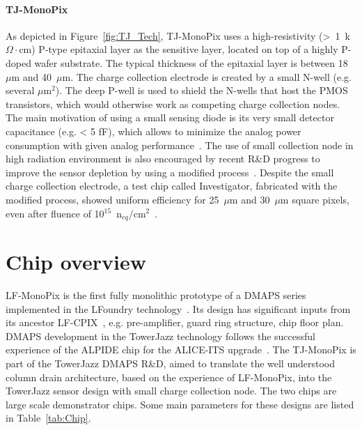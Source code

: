 \documentclass[a4paper,11pt]{article}
\begin{document}
\paragraph{TJ-MonoPix}
 
As depicted in Figure~\ref{fig:TJ_Tech}, TJ-MonoPix uses a high-resistivity (>~1~k$\Omega\cdot$cm) P-type epitaxial layer as the sensitive layer, located on top of a highly P-doped wafer substrate. The typical thickness of the epitaxial layer is between 18~$\mu$m and 40~$\mu$m. The charge collection electrode is created by a small N-well (e.g. several $\mu$m$^{2}$). The deep P-well is used to shield the N-wells that host the PMOS transistors, which would otherwise work as competing charge collection nodes. The main motivation of using a small sensing diode is its very small detector capacitance (e.g. < 5 fF), which allows to minimize the analog power consumption with given analog performance~\cite{MAPS_Snoeys_2014}. The use of small collection node in high radiation environment is also encouraged by recent R\&D progress to improve the sensor depletion by using a modified process~\cite{ModifiedProcess_Snoeys_2017}. Despite the small charge collection electrode, a test chip called Investigator, fabricated with the modified process, showed uniform efficiency for 25~$\mu$m and 30~$\mu$m square pixels, even after fluence of 10$^{15} $~n$_{eq}$/cm$^{2}$~\cite{Investigator_Pernegger_2017}.


\section{Chip overview}
\label{sec:Chip}

LF-MonoPix is the first fully monolithic prototype of a DMAPS series implemented in the LFoundry technology~\cite{CCPD_FirstResults_2016,LFCPIX_Yavuz_2017}. Its design has significant inputs from its ancestor LF-CPIX~\cite{LFCPIX_Yavuz_2017}, e.g. pre-amplifier, guard ring structure, chip floor plan. DMAPS development in the TowerJazz technology follows the successful experience of the ALPIDE chip for the ALICE-ITS upgrade~\cite{ALPIDE_Mager_2016}. The TJ-MonoPix is part of the TowerJazz DMAPS R\&D, aimed to translate the well understood column drain architecture, based on the experience of LF-MonoPix, into the TowerJazz sensor design with small charge collection node. The two chips are large scale demonstrator chips. Some main parameters for these designs are listed in Table~\ref{tab:Chip}. 
\end{document}

